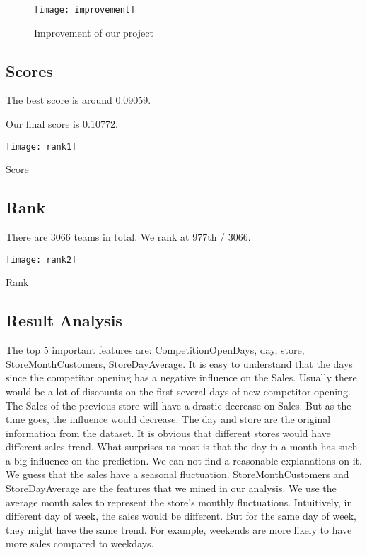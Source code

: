 \documentclass[jou,apacite]{apa6}
\begin{document}
    \begin{figure*}
    \begin{center}
    \texttt{[image: improvement]}
    \makeatletter\def\@captype{figure}\makeatother
    \caption{\centering Improvement of our project}
    \label{improvement}
    \end{center}
    \end{figure*}

\subsection{Scores}
    
    The best score is around 0.09059.
    
    Our final score is 0.10772.
    
    \begin{center}
    \texttt{[image: rank1]}
    \makeatletter\def\@captype{figure}\makeatother
    \caption{\centering Score}
    \end{center}
    
\subsection{Rank}    
    
    There are 3066 teams in total. We rank at 977th / 3066. 
    
    \begin{center}
    \texttt{[image: rank2]}
    \makeatletter\def\@captype{figure}\makeatother
    \caption{\centering Rank}
    \end{center}    

\subsection{Result Analysis}
The top 5 important features are: CompetitionOpenDays, day, store, StoreMonthCustomers, StoreDayAverage. It is easy to understand that the days since the competitor opening has a negative influence on the Sales. Usually there would be a lot of discounts on the first several days of new competitor opening. The Sales of the previous store will have a drastic decrease on Sales. But as the time goes, the influence would decrease. The day and store are the original information from the dataset. It is obvious that different stores would have different sales trend. What surprises us most is that the day in a month has such a big influence on the prediction. We can not find a reasonable explanations on it. We guess that the sales have a seasonal fluctuation. StoreMonthCustomers and StoreDayAverage are the features that we mined in our analysis. We use the average month sales to represent the store's monthly fluctuations. Intuitively, in different day of week, the sales would be different. But for the same day of week, they might have the same trend. For example, weekends are more likely to have more sales compared to weekdays.
\end{document}
